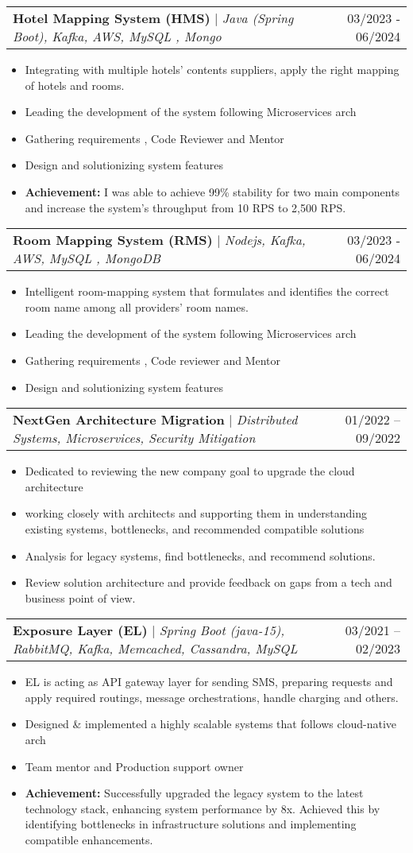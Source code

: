 \documentclass[letterpaper,11pt]{article}
\makeatletter
\newcommand{\resumeItem}[1]{
  \item\small{
    {#1 \vspace{-2pt}}
  }
}
\newcommand{\resumeProjectHeading}[2]{
    \item
    \begin{tabular*}{0.97\textwidth}{l@{\extracolsep{\fill}}r}
      \small#1 & #2 \\
    \end{tabular*}\vspace{-7pt}
}
\newcommand{\resumeItemListStart}{\begin{itemize}}
\newcommand{\resumeItemListEnd}{\end{itemize}\vspace{-5pt}}
\makeatother
\begin{document}
        \resumeProjectHeading
        {\textbf{Hotel Mapping System (HMS)} $|$ \footnotesize\emph{Java (Spring Boot), Kafka, AWS, MySQL , Mongo}}{03/2023 - 06/2024}
        \resumeItemListStart
            \resumeItem{Integrating with multiple hotels' contents suppliers, apply the right mapping of hotels and rooms.}
            \resumeItem{Leading the development of the system following Microservices arch}
            \resumeItem{Gathering requirements , Code Reviewer and Mentor }
            \resumeItem{Design and solutionizing system features}
            \resumeItem{\textbf{Achievement:} I was able to achieve 99\% stability for two main components and increase the system's throughput from 10 RPS to 2,500 RPS. }
          \resumeItemListEnd
          
        \resumeProjectHeading
        {\textbf{Room Mapping System (RMS)} $|$ \footnotesize\emph{Nodejs, Kafka, AWS, MySQL , MongoDB}}{03/2023 - 06/2024}
        \resumeItemListStart
            \resumeItem{Intelligent room-mapping system that formulates and identifies the correct room name among all providers' room names.}
            \resumeItem{Leading the development of the system following Microservices arch}
            \resumeItem{Gathering requirements , Code reviewer and Mentor }
            \resumeItem{Design and solutionizing system features}
          \resumeItemListEnd
    
    	\newpage
        \resumeProjectHeading
        {\textbf{NextGen Architecture Migration} $|$ \footnotesize\emph{Distributed Systems, Microservices, Security Mitigation}}
        {01/2022 -- 09/2022}
        \resumeItemListStart
            \resumeItem{Dedicated to reviewing the new company goal to upgrade the cloud architecture}
            \resumeItem{working closely with architects and supporting them in understanding existing systems, bottlenecks, and recommended compatible solutions}
            \resumeItem{Analysis for legacy systems, find bottlenecks, and recommend solutions.}
            \resumeItem{Review solution architecture and provide feedback on gaps from a tech and business point of view. }
          \resumeItemListEnd

        \resumeProjectHeading
        {\textbf{Exposure Layer (EL)} $|$ \footnotesize\emph{Spring Boot (java-15), RabbitMQ, Kafka, Memcached, Cassandra, MySQL}}
        {03/2021 -- 02/2023}
        \resumeItemListStart
            \resumeItem{EL is acting as API gateway layer for sending SMS, preparing requests and apply required routings, message orchestrations, handle charging and others.}
            \resumeItem{Designed \& implemented a highly scalable systems that follows cloud-native arch}
            \resumeItem{Team mentor and Production support owner}
            \resumeItem{\textbf{Achievement:} Successfully upgraded the legacy system to the latest technology stack, enhancing system performance by 8x. Achieved this by identifying bottlenecks in infrastructure solutions and implementing compatible enhancements. }
          \resumeItemListEnd
          
\end{document}
